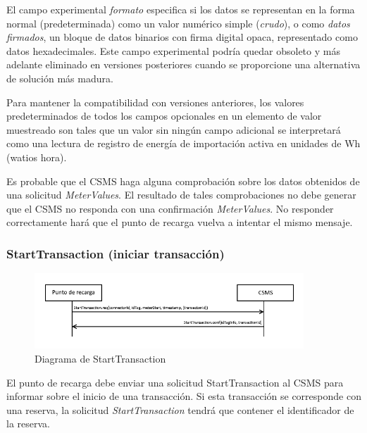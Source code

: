 \documentclass[12pt,a4paper,onecolumn,oneside]{report}
\begin{document}
El campo experimental \textit{formato} especifica si los datos se representan en la forma normal (predeterminada) como un valor numérico simple (\textit{crudo}), o como \textit{datos firmados}, un bloque de datos binarios con firma digital opaca, representado como datos hexadecimales. Este campo experimental podría quedar obsoleto y más adelante eliminado en versiones posteriores cuando se proporcione una alternativa de solución más madura.

Para mantener la compatibilidad con versiones anteriores, los valores predeterminados de todos los campos opcionales en un elemento de valor muestreado son tales que un valor sin ningún campo adicional se interpretará como una lectura de registro de energía de importación activa en unidades de Wh (watios hora).

Es probable que el CSMS haga alguna comprobación sobre los datos obtenidos de una solicitud \textit{MeterValues}. El resultado de tales comprobaciones no debe generar que el CSMS no responda con una confirmación \textit{MeterValues}. No responder correctamente hará que el punto de recarga vuelva a intentar el mismo mensaje.



\subsubsection{StartTransaction (iniciar transacción)}
\label{StartTransaction (iniciar transacción)}


\begin{figure}[h] 
\centering
  \includegraphics[width=0.9\textwidth]{figuras/diagramastarttransaction.png}
  \caption[Diagrama de \textit{StartTransaction}]{Diagrama de StartTransaction\\
  }
  \label{fig:diagramastarttransaction}
\end{figure}


El punto de recarga debe enviar una solicitud StartTransaction al CSMS para informar sobre el inicio de una transacción. Si esta transacción se corresponde con una reserva, la solicitud \textit{StartTransaction} tendrá que contener el identificador de la reserva.
\end{document}
